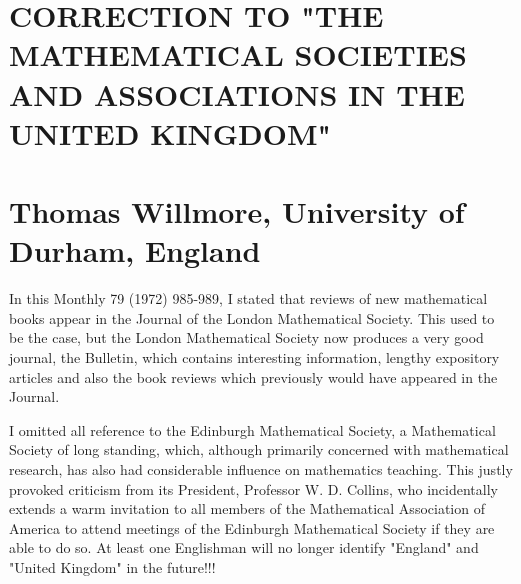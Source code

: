\documentclass[10pt]{article}
\begin{document}
\section*{CORRECTION TO "THE MATHEMATICAL SOCIETIES AND ASSOCIATIONS IN THE UNITED KINGDOM" }
\section*{Thomas Willmore, University of Durham, England}
In this Monthly 79 (1972) 985-989, I stated that reviews of new mathematical books appear in the Journal of the London Mathematical Society. This used to be the case, but the London Mathematical Society now produces a very good journal, the Bulletin, which contains interesting information, lengthy expository articles and also the book reviews which previously would have appeared in the Journal.

I omitted all reference to the Edinburgh Mathematical Society, a Mathematical Society of long standing, which, although primarily concerned with mathematical research, has also had considerable influence on mathematics teaching. This justly provoked criticism from its President, Professor W. D. Collins, who incidentally extends a warm invitation to all members of the Mathematical Association of America to attend meetings of the Edinburgh Mathematical Society if they are able to do so. At least one Englishman will no longer identify "England" and "United Kingdom" in the future!!!
\end{document}
